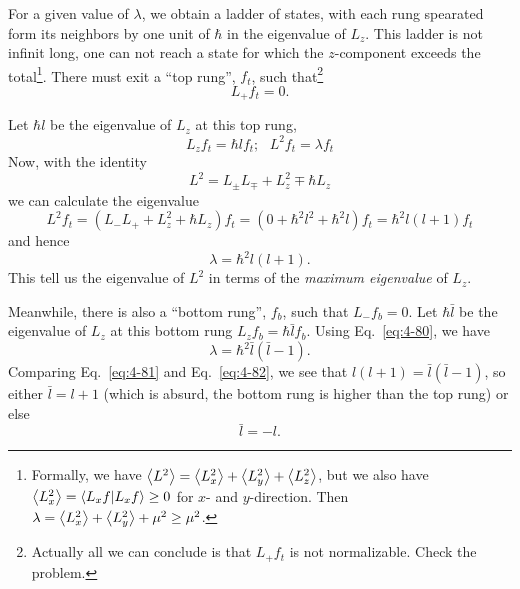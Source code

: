For a given value of $\lambda$, we obtain a ladder of states, with each rung spearated form its neighbors by one unit of $\hbar$ in the eigenvalue of $L_z$.
This ladder is not infinit long, one can not reach a state for which the $z$-component exceeds the total\footnote{Formally, we have $\expval{L^{2}} = \expval{L_x^2} + \expval{L_y^2} + \expval{L_z^2}$, but we also have $\expval{L_x^2} = \braket{L_x f} \geq 0$ for $x$- and $y$-direction. Then $\lambda = \expval{L_x^2} + \expval{L_y^2} + \mu^2 \geq \mu^{2}$.}.
There must exit a ``top rung'', $f_t$, such that\footnote{Actually all we can conclude is that $L_+f_t$ is not normalizable. Check the problem.}
\begin{equation}
  \label{eq:4-78}
  L_+f_t =0.
\end{equation}

Let $\hbar l$ be the eigenvalue of $L_z$ at this top rung,
\begin{equation}
  \label{eq:4-79}
  L_zf_t =\hbar l f_t; ~ ~ ~ L^2 f_t = \lambda f_t
\end{equation}
Now, with the identity
\begin{equation}
  \label{eq:4-80}
  L^2 = L_{\pm} L_{\mp} + L_z^2 \mp \hbar L_{z}
\end{equation}
we can calculate the eigenvalue
\begin{equation*}
  L^2 f_t = \left( L_- L_+ + L_z^2 + \hbar L_z \right) f_t = \left( 0 + \hbar^2l^2 +\hbar^2 l \right) f_t = \hbar^2 l \left( l+1 \right) f_t
\end{equation*}
and hence
\begin{equation}
  \label{eq:4-81}
  \lambda = \hbar^2 l \left( l+1 \right).
\end{equation}
This tell us the eigenvalue of $L^2$ in terms of the \textit{maximum eigenvalue} of $L_z$.

Meanwhile, there is also a ``bottom rung'', $f_b$, such that $L_- f_b = 0$.
Let $\hbar \bar{l}$ be the eigenvalue of $L_z$ at this bottom rung $L_z f_b = \hbar \bar{l}f_{b}$.
Using Eq.~\eqref{eq:4-80}, we have
\begin{equation}
  \label{eq:4-82}
  \lambda = \hbar^2 \bar{l} \left( \bar{l} - 1 \right).
\end{equation}
Comparing Eq.~\eqref{eq:4-81} and Eq.~\eqref{eq:4-82}, we see that $l \left( l+1 \right) = \bar{l} \left( \bar{l}-1 \right)$, so either $\bar{l} = l+1$ (which is absurd, the bottom rung is higher than the top rung) or else
\begin{equation}
  \label{eq:4-83}
  \bar{l} = -l.
\end{equation}


